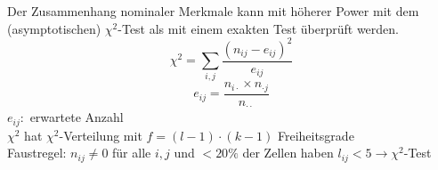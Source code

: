 \documentclass[10pt,a4paper]{article}
\theoremstyle{definition}
\begin{document}
Der Zusammenhang nominaler Merkmale kann mit höherer Power mit dem (asymptotischen) $\chi^2$-Test als mit einem exakten Test überprüft werden.
\[ \chi^2 = \sum\limits_{i,j} \frac{(n_{ij} - e_{ij})^2}{e_{ij}} \]
\[ e_{ij}= \frac{n_{i\cdot} \times n_{\cdot j}}{n_{\cdot \cdot}} \]
$e_{ij}:$ erwartete Anzahl \\
$\chi^2$ hat $\chi^2$-Verteilung mit $f=(l-1)\cdot(k-1)$ Freiheitsgrade \\
Faustregel: $n_{ij} \neq 0$ für alle $i,j$ und $< 20 \%$ der Zellen haben $l_{ij} < 5 \rightarrow \chi^2$-Test \\
\end{document}
